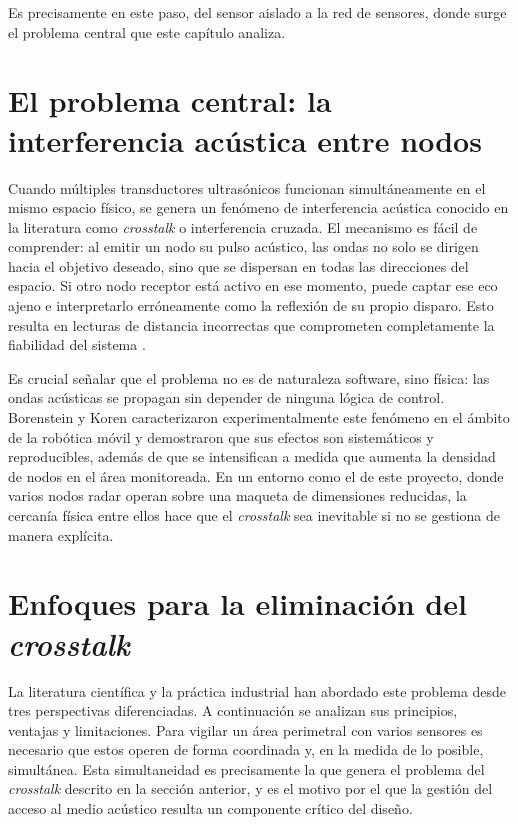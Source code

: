 Es precisamente en este paso, del sensor aislado a la red de sensores, donde surge el problema central que este capítulo analiza.

\section{El problema central: la interferencia acústica entre nodos}

Cuando múltiples transductores ultrasónicos funcionan simultáneamente en el mismo espacio físico, se genera un fenómeno de interferencia acústica conocido en la literatura como \textit{crosstalk} o interferencia cruzada. El mecanismo es fácil de comprender: al emitir un nodo su pulso acústico, las ondas no solo se dirigen hacia el objetivo deseado, sino que se dispersan en todas las direcciones del espacio. Si otro nodo receptor está activo en ese momento, puede captar ese eco ajeno e interpretarlo erróneamente como la reflexión de su propio disparo. Esto resulta en lecturas de distancia incorrectas que comprometen completamente la fiabilidad del sistema \cite{9}.

Es crucial señalar que el problema no es de naturaleza software, sino física: las ondas acústicas se propagan sin depender de ninguna lógica de control. Borenstein y Koren \cite{9} caracterizaron experimentalmente este fenómeno en el ámbito de la robótica móvil y demostraron que sus efectos son sistemáticos y reproducibles, además de que se intensifican a medida que aumenta la densidad de nodos en el área monitoreada. En un entorno como el de este proyecto, donde varios nodos radar operan sobre una maqueta de dimensiones reducidas, la cercanía física entre ellos hace que el \textit{crosstalk} sea inevitable si no se gestiona de manera explícita.

\section{Enfoques para la eliminación del \textit{crosstalk}}

La literatura científica y la práctica industrial han abordado este problema desde tres perspectivas diferenciadas. A continuación se analizan sus principios, ventajas y limitaciones. Para vigilar un área perimetral con varios sensores es necesario que estos operen de forma coordinada y, en la medida de lo posible, simultánea. Esta simultaneidad es precisamente la que genera el problema del \textit{crosstalk} descrito en la sección anterior, y es el motivo por el que la gestión del acceso al medio acústico resulta un componente crítico del diseño.

